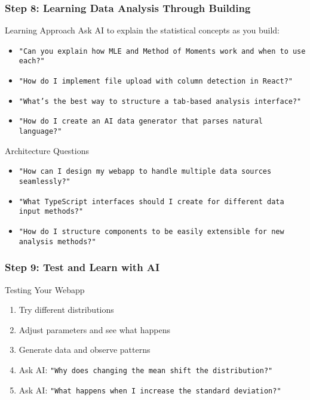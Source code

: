 \documentclass[aspectratio=169]{beamer}
\begin{document}
\begin{frame}
\frametitle{Step 8: Learning Data Analysis Through Building}
\begin{alertblock}{Learning Approach}
Ask AI to explain the statistical concepts as you build:
\begin{itemize}
\item \texttt{"Can you explain how MLE and Method of Moments work and when to use each?"}
\item \texttt{"How do I implement file upload with column detection in React?"}
\item \texttt{"What's the best way to structure a tab-based analysis interface?"}
\item \texttt{"How do I create an AI data generator that parses natural language?"}
\end{itemize}
\end{alertblock}

\begin{exampleblock}{Architecture Questions}
\begin{itemize}
\item \texttt{"How can I design my webapp to handle multiple data sources seamlessly?"}
\item \texttt{"What TypeScript interfaces should I create for different data input methods?"}
\item \texttt{"How do I structure components to be easily extensible for new analysis methods?"}
\end{itemize}
\end{exampleblock}
\end{frame}

\begin{frame}
\frametitle{Step 9: Test and Learn with AI}
\begin{alertblock}{Testing Your Webapp}
\begin{enumerate}
\item Try different distributions
\item Adjust parameters and see what happens
\item Generate data and observe patterns
\item Ask AI: \texttt{"Why does changing the mean shift the distribution?"}
\item Ask AI: \texttt{"What happens when I increase the standard deviation?"}
\end{enumerate}
\end{alertblock}
\end{frame}
\end{document}
